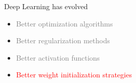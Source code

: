\begin{frame}
\end{frame}

\begin{frame}
	\begin{block}{Deep Learning has evolved}
		\begin{itemize}
			\justifying
			\item \textcolor{gray}{Better optimization algorithms}
			\item \textcolor{gray}{Better regularization methods}
			\item \textcolor{gray}{Better activation functions}
			\item \textcolor{red}{Better weight initialization strategies}
		\end{itemize}
		
	\end{block}
\end{frame}


